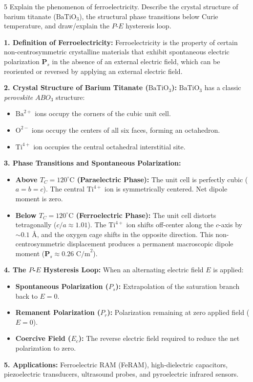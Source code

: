 \begin{theoryq}{5}
Explain the phenomenon of ferroelectricity. Describe the crystal structure of barium titanate ($\text{BaTiO}_3$), the structural phase transitions below Curie temperature, and draw/explain the $P$-$E$ hysteresis loop.
\end{theoryq}
\begin{theorysol}
\textbf{1. Definition of Ferroelectricity:}
Ferroelectricity is the property of certain non-centrosymmetric crystalline materials that exhibit spontaneous electric polarization $\mathbf{P}_s$ in the absence of an external electric field, which can be reoriented or reversed by applying an external electric field.

\textbf{2. Crystal Structure of Barium Titanate ($\text{BaTiO}_3$):}
$\text{BaTiO}_3$ has a classic \textit{perovskite} $ABO_3$ structure:
\begin{itemize}
\item $\text{Ba}^{2+}$ ions occupy the corners of the cubic unit cell.
\item $\text{O}^{2-}$ ions occupy the centers of all six faces, forming an octahedron.
\item $\text{Ti}^{4+}$ ion occupies the central octahedral interstitial site.
\end{itemize}

\textbf{3. Phase Transitions and Spontaneous Polarization:}
\begin{itemize}
\item \textbf{Above $T_C = 120^\circ\text{C}$ (Paraelectric Phase):} The unit cell is perfectly cubic ($a = b = c$). The central $\text{Ti}^{4+}$ ion is symmetrically centered. Net dipole moment is zero.
\item \textbf{Below $T_C = 120^\circ\text{C}$ (Ferroelectric Phase):} The unit cell distorts tetragonally ($c/a \approx 1.01$). The $\text{Ti}^{4+}$ ion shifts off-center along the $c$-axis by $\sim 0.1\text{ \AA}$, and the oxygen cage shifts in the opposite direction. This non-centrosymmetric displacement produces a permanent macroscopic dipole moment ($\mathbf{P}_s \approx 0.26\text{ C/m}^2$).
\end{itemize}

\textbf{4. The $P$-$E$ Hysteresis Loop:}
When an alternating electric field $E$ is applied:
\begin{itemize}
\item \textbf{Spontaneous Polarization ($P_s$):} Extrapolation of the saturation branch back to $E=0$.
\item \textbf{Remanent Polarization ($P_r$):} Polarization remaining at zero applied field ($E=0$).
\item \textbf{Coercive Field ($E_c$):} The reverse electric field required to reduce the net polarization to zero.
\end{itemize}

\textbf{5. Applications:}
Ferroelectric RAM (FeRAM), high-dielectric capacitors, piezoelectric transducers, ultrasound probes, and pyroelectric infrared sensors.
\end{theorysol}
\vspace{4mm}

